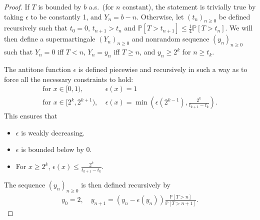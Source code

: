 \begin{proof}
If $T$ is bounded by $b$ a.s.~(for $n$ constant), the statement is trivially true by taking $\epsilon$ to be constantly 1, and $Y_n = b - n$.
Otherwise, let $(t_n)_{n \geq 0}$ be defined recursively such that $t_0 = 0$, $t_{n+1} > t_n$ and $\mathbb P[T > t_{n+1}] \leq \frac 1 4 \mathbb P[T > t_n]$.
We will then define a supermartingale $(Y_n)_{n \geq 0}$ and nonrandom sequence $(y_n)_{n \geq 0}$ such that $Y_n = 0$ iff $T < n$, $Y_n = y_n$ iff $T \geq n$, and $y_n \geq 2^k$ for $n \geq t_k$.

The antitone function $\epsilon$ is defined piecewise and recursively in such a way as to force all the necessary constraints to hold:
\begin{align*}
    \text{for }x \in [0,1),\ &\epsilon(x) = 1 \\
    \text{for }x \in [2^k,2^{k+1}),\ &\epsilon(x) = \min \left (\epsilon(2^{k-1}), \frac{2^k}{t_{k+1}-t_k} \right ).
\end{align*}
This ensures that
\begin{itemize}
\item $\epsilon$ is weakly decreasing. 
\item $\epsilon$ is bounded below by 0.
\item For $x \geq 2^k$, $\epsilon(x) \leq \frac{2^k}{t_{k+1}-t_k}$. 
\end{itemize}

The sequence $(y_n)_{n \geq 0}$ is then defined recursively by
\begin{align*}
    y_0 = 2, \quad
    y_{n+1} = (y_n - \epsilon(y_n)) \frac{\mathbb P[T > n]}{\mathbb P[T > n+1]}.
\end{align*}


\end{proof}
